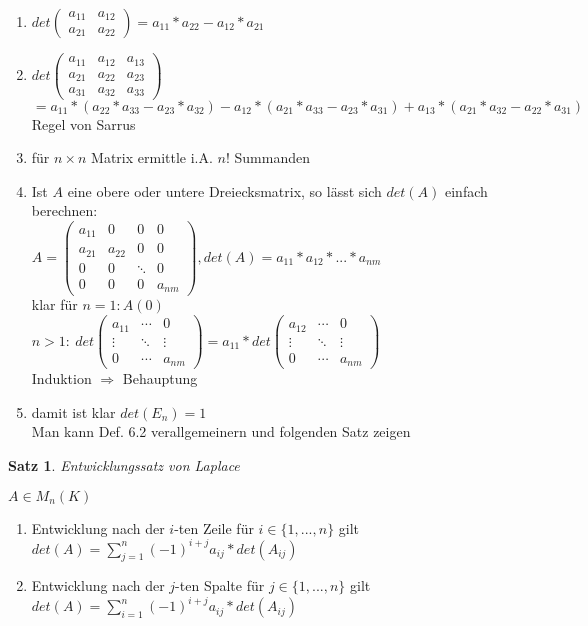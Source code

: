\documentclass[a4paper,11pt]{article}
\newtheorem{satz}[definition]{Satz}
\begin{document}
\begin{enumerate}[label=\alph*)]
\item $det\begin{pmatrix}a_{11}&a_{12}\\a_{21}&a_{22}\end{pmatrix}=a_{11}*a_{22}-a_{12}*a_{21}$
\item $det\begin{pmatrix}a_{11}&a_{12}&a_{13}\\a_{21}&a_{22}&a_{23}\\a_{31}&a_{32}&a_{33}\end{pmatrix}$ \\
$=a_{11}*(a_{22}*a_{33}-a_{23}*a_{32})-a_{12}*(a_{21}*a_{33}-a_{23}*a_{31})+a_{13}*(a_{21}*a_{32}-a_{22}*a_{31})$ \\
Regel von Sarrus
\item für $n\times n$ Matrix ermittle i.A. $n!$ Summanden
\item Ist $A$ eine obere oder untere Dreiecksmatrix, so lässt sich $det(A)$ einfach berechnen: \\
$A=\begin{pmatrix}a_{11}&0&0&0\\a_{21}&a_{22}&0&0\\0&0&\ddots&0\\0&0&0&a_{nm}\end{pmatrix}, det(A)=a_{11}*a_{12}*...*a_{nm}$ \\
klar für $n=1: A(0)$ \\
$n>1:\:det\begin{pmatrix}a_{11}&\cdots&0\\\vdots&\ddots&\vdots\\0&\cdots&a_{nm}\end{pmatrix}=a_{11}*det\begin{pmatrix}a_{12}&\cdots&0\\\vdots&\ddots&\vdots\\0&\cdots&a_{nm}\end{pmatrix}$ \\
Induktion $\Rightarrow$ Behauptung
\item damit ist klar $det(E_n)=1$ \\
Man kann Def. 6.2 verallgemeinern und folgenden Satz zeigen
\end{enumerate}
\newpage
\begin{satz}
Entwicklungssatz von Laplace
\end{satz}
$A\in M_n(K)$
\begin{enumerate}[label=\alph*)]
\item Entwicklung nach der $i$-ten Zeile für $i\in\{1,...,n\}$ gilt $det(A)=\sum^n_{j=1}(-1)^{i+j}a_{ij}*det(A_{ij})$ 
\item Entwicklung nach der $j$-ten Spalte für $j\in\{1,...,n\}$ gilt $det(A)=\sum^n_{i=1}(-1)^{i+j}a_{ij}*det(A_{ij})$
\end{enumerate}
\end{document}
